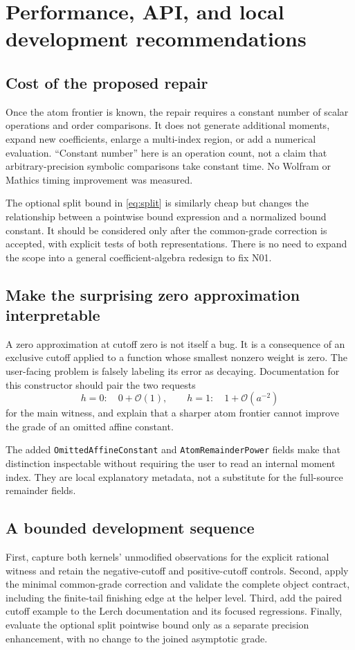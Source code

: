 \documentclass[11pt,letterpaper]{article}
\newcommand{\code}[1]{\nolinkurl{#1}}
\newcommand{\OO}{\mathcal{O}}
\begin{document}
\section{Performance, API, and local development recommendations}
\subsection{Cost of the proposed repair}
Once the atom frontier is known, the repair requires a constant number of
scalar operations and order comparisons. It does not generate additional
moments, expand new coefficients, enlarge a multi-index region, or add a
numerical evaluation. ``Constant number'' here is an operation count, not a
claim that arbitrary-precision symbolic comparisons take constant time. No
Wolfram or Mathics timing improvement was measured.

The optional split bound in \eqref{eq:split} is similarly cheap but changes the
relationship between a pointwise bound expression and a normalized bound
constant. It should be considered only after the common-grade correction is
accepted, with explicit tests of both representations. There is no need to
expand the scope into a general coefficient-algebra redesign to fix N01.

\subsection{Make the surprising zero approximation interpretable}
A zero approximation at cutoff zero is not itself a bug. It is a consequence
of an exclusive cutoff applied to a function whose smallest nonzero weight is
zero. The user-facing problem is falsely labeling its error as decaying.
Documentation for this constructor should pair the two requests
\[
 h=0:\quad 0+\OO(1),\qquad
 h=1:\quad 1+\OO(a^{-2})
\]
for the main witness, and explain that a sharper atom frontier cannot improve
the grade of an omitted affine constant.

The added \code{OmittedAffineConstant} and \code{AtomRemainderPower} fields
make that distinction inspectable without requiring the user to read an
internal moment index. They are local explanatory metadata, not a substitute
for the full-source remainder fields.

\subsection{A bounded development sequence}
First, capture both kernels' unmodified observations for the explicit rational
witness and retain the negative-cutoff and positive-cutoff controls. Second,
apply the minimal common-grade correction and validate the complete object
contract, including the finite-tail finishing edge at the helper level.
Third, add the paired cutoff example to the Lerch documentation and its focused
regressions. Finally, evaluate the optional split pointwise bound only as a
separate precision enhancement, with no change to the joined asymptotic grade.
\end{document}
